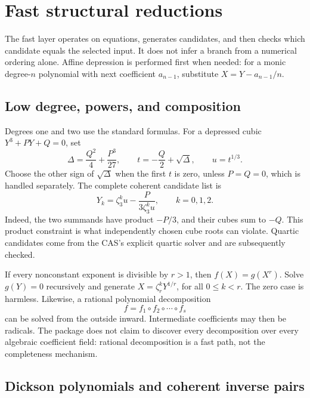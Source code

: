 \documentclass[11pt,letterpaper]{article}
\theoremstyle{definition}\newtheorem{definition}[theorem]{Definition}
\theoremstyle{remark}\newtheorem{remark}[theorem]{Remark}
\begin{document}
\section{Fast structural reductions}
\label{sec:fast}

The fast layer operates on equations, generates candidates, and then checks
which candidate equals the selected input. It does not infer a branch from
a numerical ordering alone. Affine depression is performed first when
needed: for a monic degree-\(n\) polynomial with next coefficient \(a_{n-1}\),
substitute \(X=Y-a_{n-1}/n\).

\subsection{Low degree, powers, and composition}

Degrees one and two use the standard formulas. For a depressed cubic
\(Y^3+PY+Q=0\), set
\[
 \Delta=\frac{Q^2}{4}+\frac{P^3}{27},\qquad
 t=-\frac Q2+\sqrt\Delta,\qquad u=t^{1/3}.
\]
Choose the other sign of \(\sqrt\Delta\) when the first \(t\) is zero, unless
\(P=Q=0\), which is handled separately. The complete coherent candidate list
is
\[
        Y_k=\zeta_3^k u-\frac{P}{3\zeta_3^k u},
        \qquad k=0,1,2.
\]
Indeed, the two summands have product \(-P/3\), and their cubes sum to \(-Q\).
This product constraint is what independently chosen cube roots can violate.
Quartic candidates come from the CAS's explicit quartic solver and are
subsequently checked.

If every nonconstant exponent is divisible by \(r>1\), then
\(f(X)=g(X^r)\). Solve \(g(Y)=0\) recursively and generate
\(X=\zeta_r^kY^{1/r}\), for all \(0\leq k<r\).
The zero case is harmless. Likewise, a rational polynomial decomposition
\[
                 f=f_1\circ f_2\circ\cdots\circ f_s
\]
can be solved from the outside inward. Intermediate coefficients may then
be radicals. The package does not claim to discover every decomposition
over every algebraic coefficient field: rational decomposition is a fast
path, not the completeness mechanism.

\subsection{Dickson polynomials and coherent inverse pairs}
\end{document}
